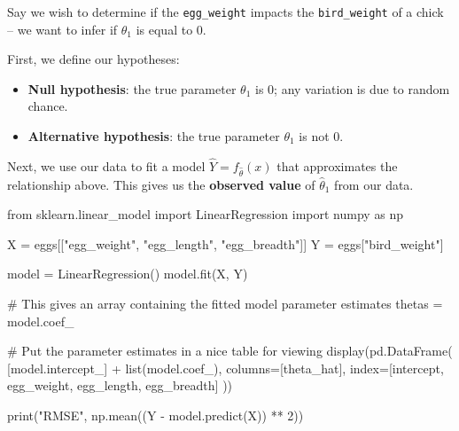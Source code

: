 \documentclass[
  letterpaper,
  DIV=11,
  numbers=noendperiod]{scrreprt}
\newenvironment{Shaded}{\begin{snugshade}}{\end{snugshade}}
\newcommand{\BuiltInTok}[1]{\textcolor[rgb]{0.00,0.23,0.31}{#1}}
\newcommand{\CommentTok}[1]{\textcolor[rgb]{0.37,0.37,0.37}{#1}}
\newcommand{\DecValTok}[1]{\textcolor[rgb]{0.68,0.00,0.00}{#1}}
\newcommand{\ImportTok}[1]{\textcolor[rgb]{0.00,0.46,0.62}{#1}}
\newcommand{\NormalTok}[1]{\textcolor[rgb]{0.00,0.23,0.31}{#1}}
\newcommand{\OperatorTok}[1]{\textcolor[rgb]{0.37,0.37,0.37}{#1}}
\newcommand{\StringTok}[1]{\textcolor[rgb]{0.13,0.47,0.30}{#1}}
\providecommand{\tightlist}{%
  \setlength{\itemsep}{0pt}\setlength{\parskip}{0pt}}\usepackage{longtable,booktabs,array}
\begin{document}
Say we wish to determine if the \texttt{egg\_weight} impacts the
\texttt{bird\_weight} of a chick -- we want to infer if \(\theta_1\) is
equal to 0.

First, we define our hypotheses:

\begin{itemize}
\tightlist
\item
  \textbf{Null hypothesis}: the true parameter \(\theta_1\) is 0; any
  variation is due to random chance.
\item
  \textbf{Alternative hypothesis}: the true parameter \(\theta_1\) is
  not 0.
\end{itemize}

Next, we use our data to fit a model \(\hat{Y} = f_{\hat{\theta}}(x)\)
that approximates the relationship above. This gives us the
\textbf{observed value} of \(\hat{\theta}_1\) from our data.

\begin{Shaded}
\begin{Highlighting}[]
\ImportTok{from}\NormalTok{ sklearn.linear\_model }\ImportTok{import}\NormalTok{ LinearRegression}
\ImportTok{import}\NormalTok{ numpy }\ImportTok{as}\NormalTok{ np}

\NormalTok{X }\OperatorTok{=}\NormalTok{ eggs[[}\StringTok{"egg\_weight"}\NormalTok{, }\StringTok{"egg\_length"}\NormalTok{, }\StringTok{"egg\_breadth"}\NormalTok{]]}
\NormalTok{Y }\OperatorTok{=}\NormalTok{ eggs[}\StringTok{"bird\_weight"}\NormalTok{]}

\NormalTok{model }\OperatorTok{=}\NormalTok{ LinearRegression()}
\NormalTok{model.fit(X, Y)}

\CommentTok{\# This gives an array containing the fitted model parameter estimates}
\NormalTok{thetas }\OperatorTok{=}\NormalTok{ model.coef\_}

\CommentTok{\# Put the parameter estimates in a nice table for viewing}
\NormalTok{display(pd.DataFrame(}
\NormalTok{  [model.intercept\_] }\OperatorTok{+} \BuiltInTok{list}\NormalTok{(model.coef\_),}
\NormalTok{  columns}\OperatorTok{=}\NormalTok{[}\StringTok{\textquotesingle{}theta\_hat\textquotesingle{}}\NormalTok{],}
\NormalTok{  index}\OperatorTok{=}\NormalTok{[}\StringTok{\textquotesingle{}intercept\textquotesingle{}}\NormalTok{, }\StringTok{\textquotesingle{}egg\_weight\textquotesingle{}}\NormalTok{, }\StringTok{\textquotesingle{}egg\_length\textquotesingle{}}\NormalTok{, }\StringTok{\textquotesingle{}egg\_breadth\textquotesingle{}}\NormalTok{]}
\NormalTok{))}

\BuiltInTok{print}\NormalTok{(}\StringTok{"RMSE"}\NormalTok{, np.mean((Y }\OperatorTok{{-}}\NormalTok{ model.predict(X)) }\OperatorTok{**} \DecValTok{2}\NormalTok{))}
\end{Highlighting}
\end{Shaded}
\end{document}
